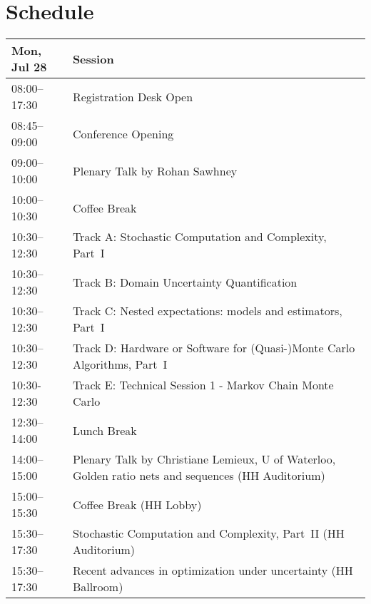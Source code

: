 \chapter{Schedule}
\begin{table}
{\footnotesize
\begin{tabularx}{\textwidth}{>{\hsize=0.32\hsize}X|>{\hsize=1.7\hsize}X}
\hline
\textbf{Mon, Jul 28} & \textbf{Session} \\
\hline
\cellcolor{\EmptyColor}08:00–17:30 & \cellcolor{\EmptyColor}Registration Desk Open \\
\cellcolor{\PlenaryColor}08:45–09:00 & \cellcolor{\PlenaryColor}Conference Opening \\
\cellcolor{\PlenaryColor}09:00–10:00 & \cellcolor{\PlenaryColor}Plenary Talk by Rohan Sawhney \\
\cellcolor{\EmptyColor}10:00–10:30 & \cellcolor{\EmptyColor}Coffee Break \\
\cellcolor{\SessionTitleColor}10:30–12:30 & \cellcolor{\SessionTitleColor}Track A: Stochastic Computation and Complexity, Part~I \\
\cellcolor{\SessionTitleColor}10:30–12:30 & \cellcolor{\SessionTitleColor}Track B: Domain Uncertainty Quantification \\
\cellcolor{\SessionTitleColor}10:30–12:30 & \cellcolor{\SessionTitleColor}Track C: Nested expectations: models and estimators, Part~I \\
\cellcolor{\SessionTitleColor}10:30–12:30 & \cellcolor{\SessionTitleColor}Track D: Hardware or Software for (Quasi-)Monte Carlo Algorithms, Part~I \\
\cellcolor{\SessionLightColor}10:30-12:30 & \cellcolor{\SessionLightColor}Track E: Technical Session 1 - Markov Chain Monte Carlo \\
\cellcolor{\EmptyColor}12:30–14:00 & \cellcolor{\EmptyColor}Lunch Break \\
\cellcolor{\PlenaryColor}14:00–15:00 & \cellcolor{\PlenaryColor}Plenary Talk by Christiane Lemieux, U of Waterloo, Golden ratio nets and sequences (HH Auditorium) \\
\cellcolor{\EmptyColor}15:00–15:30 & \cellcolor{\EmptyColor}Coffee Break (HH Lobby) \\
\cellcolor{\SessionTitleColor}15:30–17:30 & \cellcolor{\SessionTitleColor}Stochastic Computation and Complexity, Part~II (HH Auditorium) \\
\cellcolor{\SessionTitleColor}15:30–17:30 & \cellcolor{\SessionTitleColor}Recent advances in optimization under uncertainty (HH Ballroom) \\

\end{tabularx}}
\end{table}
